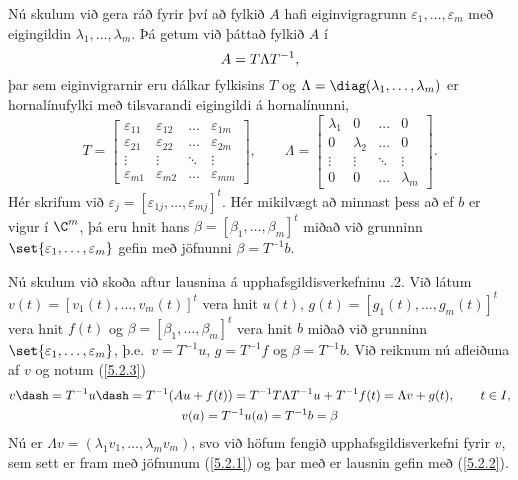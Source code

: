 Nú skulum við  gera ráð fyrir því að
fylkið $A$ hafi eiginvigragrunn
$\varepsilon_1,\dots, \varepsilon_m$ með
eigingildin $\lambda_1,\dots,\lambda_m$.  Þá getum við þáttað fylkið
$A$ í
 \begin{equation*}A=T\Lambda T\sp{-1},\label{5.2.3}
 \end{equation*}
þar sem eiginvigrarnir eru dálkar fylkisins $T$  og
$\Lambda=\diag(\lambda_1,\dots,\lambda_m)  $ er
hornalínufylki með tilsvarandi  eigingildi á hornalínunni,
 $$T=\left[\begin{matrix}
\varepsilon_{11}&\varepsilon_{12}&\dots&\varepsilon_{1m}\\
\varepsilon_{21}&\varepsilon_{22}&\dots&\varepsilon_{2m}\\
\vdots&\vdots&\ddots&\vdots\\
\varepsilon_{m1}&\varepsilon_{m2}&\dots&\varepsilon_{mm}
\end{matrix}\right],\qquad
\Lambda =\left[\begin{matrix}
\lambda_1&0&\dots&0\\
0&\lambda_2&\dots&0\\
\vdots&\vdots&\ddots&\vdots\\
0&0&\dots&\lambda_m
\end{matrix}\right].
 $$
Hér skrifum við $\varepsilon_j=[\varepsilon_{1j},\dots,\varepsilon_{mj}]^t$.  
Hér mikilvægt að minnast þess að ef $b$ er vigur í $\C^m$, þá eru
hnit hans $\beta=[\beta_1,\dots,\beta_m]^t$ miðað við grunninn
$\set{\varepsilon_1,\dots,\varepsilon_m}$ gefin með  jöfnunni ${\beta}=T^{-1}b$.

Nú skulum við skoða aftur lausnina á upphafsgildisverkefninu .2.
Við látum $v(t)=[v_1(t),\dots,v_m(t)]^t$ vera hnit $u(t)$, 
$g(t)=[g_1(t),\dots,g_m(t)]^t$ vera hnit $f(t)$ og
$\beta=[\beta_1,\dots,\beta_m]^t$ 
vera hnit $b$ miðað við grunninn
$\set{\varepsilon_1,\dots,\varepsilon_m}$, þ.e.~$v=T^{-1}u$,
$g=T^{-1}f$ og $\beta=T^{-1}b$.
Við reiknum nú afleiðuna af $v$ og notum (\ref{5.2.3})
\begin{gather*}
v\dash=T^{-1}u\dash=T^{-1}(Au+f(t))=
T^{-1}T\Lambda T^{-1}u+T^{-1}f(t)=\Lambda v+g(t), \qquad t\in I,\\
v(a)=T^{-1}u(a)=T^{-1}b=\beta 
\end{gather*}
Nú er $\Lambda v=(\lambda_1v_1,\dots,\lambda_mv_m)$, svo við höfum fengið
upphafsgildisverkefni fyrir $v$, sem sett
er fram með jöfnunum (\ref{5.2.1}) og þar með er lausnin gefin með 
(\ref{5.2.2}).


